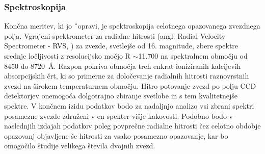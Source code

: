 \subsubsection{Spektroskopija}
Končna meritev, ki jo \G\ opravi, je spektroskopija celotnega opazovanega zvezdnega polja. Vgrajeni spektrometer za radialne hitrosti (angl. Radial Velocity Spectrometer - RVS, \cite{2018A&A...616A...5C}) za zvezde, svetlejše od 16. magnitude, zbere spektre srednje ločljivosti z resolucijsko močjo R $\sim$11.700 na spektralnem območju od 8450 do 8720~\AA. Razpon pokriva območja treh enkrat ioniziranih kalcijevih absorpcijskih črt, ki so primerne za določevanje radialnih hitrosti raznovrstnih zvezd na širokem temperaturnem območju. Hitro potovanje zvezd po polju CCD detektorjev onemogoča dolgotrajno zbiranje svetlobe in s tem kvalitetnejše spektre. V končnem izidu podatkov bodo za nadaljnjo analizo vsi zbrani spektri posamezne zvezde združeni v en spekter višje kakovosti. Podobno bodo v naslednjih izdajah podatkov poleg povprečne radialne hitrosti čez celotno obdobje opazovanj objavljene še hitrosti za vsako posamezno opazovanje, kar bo omogočilo študije velikega števila dvojnih zvezd.



